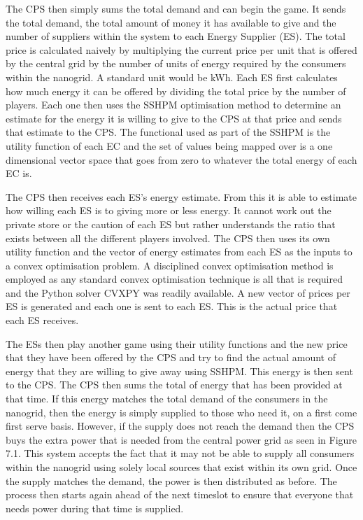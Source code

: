 \documentclass[a4paper, notitlepage]{report}
\begin{document}
The CPS then simply sums the total demand and can begin the game. It sends the
total demand, the total amount of money it has available to give and the
number of suppliers within the system to each Energy Supplier (ES). The total
price is calculated naively by multiplying the current price per unit that is
offered by the central grid by the number of units of energy required by the
consumers within the nanogrid. A standard unit would be kWh. Each ES first
calculates how much energy it can be offered by dividing the total price by the
number of players. Each one then uses the SSHPM optimisation method to determine
an estimate for the energy it is willing to give to the CPS at that price and
sends that estimate to the CPS. The functional used as part of the SSHPM is the
utility function of each EC and the set of values being mapped over is a one
dimensional vector space that goes from zero to whatever the total energy of
each EC is.

The CPS then receives each ES's energy estimate. From this it is able to
estimate how willing each ES is to giving more or less energy. It cannot work
out the private store or the caution of each ES but rather understands the ratio
that exists between all the different players involved. The CPS then uses its
own utility function and the vector of energy estimates from each ES as the
inputs to a convex optimisation problem. A disciplined convex optimisation
method is employed \cite{grant2006disciplined} as any standard convex optimisation 
technique is all that is required and the Python solver CVXPY \cite{diamond2016cvxpy} was readily
available. A new vector of prices per ES is generated and each one is sent to
each ES. This is the actual price that each ES receives.

The ESs then play another game using their utility functions and the new price
that they have been offered by the CPS and try to find the actual amount of
energy that they are willing to give away using SSHPM. This energy is then sent
to the CPS. The CPS then sums the total of energy that has been provided at that
time. If this energy matches the total demand of the consumers in the nanogrid,
then the energy is simply supplied to those who need it, on a first come first
serve basis. However, if the supply does not reach the demand then the CPS buys
the extra power that is needed from the central power grid as seen in Figure
7.1. This system accepts the fact that it may not be able to supply all
consumers within the nanogrid using solely local sources that exist within its
own grid. Once the supply matches the demand, the power is then distributed as
before. The process then starts again ahead of the next timeslot to ensure that
everyone that needs power during that time is supplied.
\end{document}
